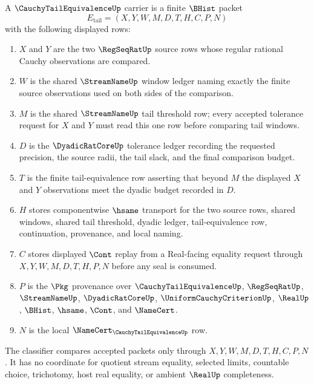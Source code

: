 \begin{definition}
\label{def:cauchy-tail-equivalence-carrier}
A $\CauchyTailEquivalenceUp$ carrier is a finite $\BHist$ packet
$$
E_{\mathrm{tail}}=(X,Y,W,M,D,T,H,C,P,N)
$$
with the following displayed rows:
\begin{enumerate}
\item $X$ and $Y$ are the two $\RegSeqRatUp$ source rows whose regular rational Cauchy observations are compared.
\item $W$ is the shared $\StreamNameUp$ window ledger naming exactly the finite source observations used on both sides of the comparison.
\item $M$ is the shared $\StreamNameUp$ tail threshold row; every accepted tolerance request for $X$ and $Y$ must read this one row before comparing tail windows.
\item $D$ is the $\DyadicRatCoreUp$ tolerance ledger recording the requested precision, the source radii, the tail slack, and the final comparison budget.
\item $T$ is the finite tail-equivalence row asserting that beyond $M$ the displayed $X$ and $Y$ observations meet the dyadic budget recorded in $D$.
\item $H$ stores componentwise $\hsame$ transport for the two source rows, shared windows, shared tail threshold, dyadic ledger, tail-equivalence row, continuation, provenance, and local naming.
\item $C$ stores displayed $\Cont$ replay from a Real-facing equality request through $X,Y,W,M,D,T,H,P,N$ before any seal is consumed.
\item $P$ is the $\Pkg$ provenance over $\CauchyTailEquivalenceUp$, $\RegSeqRatUp$, $\StreamNameUp$, $\DyadicRatCoreUp$, $\UniformCauchyCriterionUp$, $\RealUp$, $\BHist$, $\hsame$, $\Cont$, and $\NameCert$.
\item $N$ is the local $\NameCert_{\CauchyTailEquivalenceUp}$ row.
\end{enumerate}
The classifier compares accepted packets only through $X,Y,W,M,D,T,H,C,P,N$. It has no coordinate for quotient stream equality, selected limits, countable choice, trichotomy, host real equality, or ambient $\RealUp$ completeness.
\end{definition}

